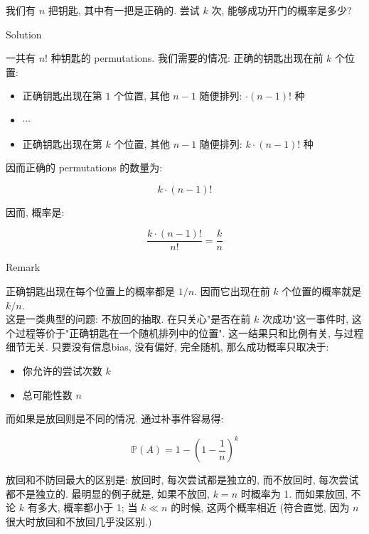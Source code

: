 \begin{example}

我们有 \(\mathit{n}\) 把钥匙, 其中有一把是正确的. 尝试 \(\mathit{k}\) 次, 能够成功开门的概率是多少?

\end{example}

\begin{qlsolution}{Solution}

一共有 \(\mathit{n}!\) 种钥匙的 permutations. 我们需要的情况: 正确的钥匙出现在前 \(\mathit{k}\) 个位置:

\begin{itemize}
\item
  正确钥匙出现在第 \(1\) 个位置, 其他 \(\mathit{n} - 1\) 随便排列: \(\cdot (\mathit{n} - 1)!\) 种
\item
  \(\cdots\)
\item
  正确钥匙出现在第 \(\mathit{k}\) 个位置, 其他 \(\mathit{n} - 1\) 随便排列: \(\mathit{k} \cdot (\mathit{n} - 1)!\) 种
\end{itemize}

因而正确的 permutations 的数量为:

\[\mathit{k} \cdot (\mathit{n} - 1)!\]

因而, 概率是:

\[\frac{\mathit{k} \cdot (\mathit{n} - 1)!}{\mathit{n}!} = \frac{\mathit{k}}{\mathit{n}}\]

\end{qlsolution}

\begin{qlremark}{Remark}

正确钥匙出现在每个位置上的概率都是 \(1/\mathit{n}\). 因而它出现在前 \(\mathit{k}\) 个位置的概率就是 \(\mathit{k}/\mathit{n}\).\\
这是一类典型的问题: 不放回的抽取. 在只关心"是否在前 \(\mathit{k}\) 次成功"这一事件时, 这个过程等价于"正确钥匙在一个随机排列中的位置". 这一结果只和比例有关, 与过程细节无关. 只要没有信息bias, 没有偏好, 完全随机, 那么成功概率只取决于:

\begin{itemize}
\item
  你允许的尝试次数 \(\mathit{k}\)
\item
  总可能性数 \(\mathit{n}\)
\end{itemize}

而如果是放回则是不同的情况. 通过补事件容易得:

\[\mathbb{P}(\mathit{A}) = 1 - \left( {1 - \frac{1}{\mathit{n}}} \right)^{\mathit{k}}\]

放回和不防回最大的区别是: 放回时, 每次尝试都是独立的, 而不放回时, 每次尝试都不是独立的. 最明显的例子就是, 如果不放回, \(\mathit{k} = \mathit{n}\) 时概率为 1. 而如果放回, 不论 \(\mathit{k}\) 有多大, 概率都小于 1; 当 \(\mathit{k} \ll \mathit{n}\) 的时候, 这两个概率相近 (符合直觉, 因为 \(\mathit{n}\) 很大时放回和不放回几乎没区别.)

\end{qlremark}

